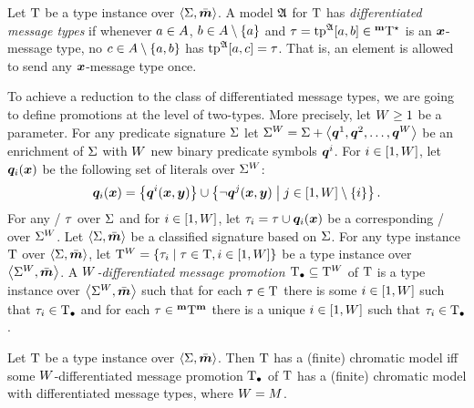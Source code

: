 \begin{definition}
Let $\mathrm{T}$ be a type instance over $\left\langle \mathrm{\Sigma},\bar{\bm{m}} \right\rangle$.
A model $\mathfrak{A}$ for $\mathrm{T}$ has \emph{differentiated message types}
if whenever $a\in A$, $b\in A\setminus\left\{a\right\}$
and $\tau = \operatorname{tp}^{\mathfrak{A}}[a,b]\in{{}^{\bm{\mathrm{m}}}{\mathrm{T}}^{\star}}$ is an $\bm{x}$-message type,
no $c\in A\setminus\left\{a,b\right\}$ has $\operatorname{tp}^{\mathfrak{A}}[a,c] = \tau$.
That is, an element is allowed to send any $\bm{x}$-message type once.
\end{definition}
To achieve a reduction to the class of differentiated message types, we are
going to define promotions at the level of two-types.
More precisely, let $W\geq1$ be a parameter.
For any predicate signature $\mathrm{\Sigma}$ let ${\mathrm{\Sigma}}^{W} = \mathrm{\Sigma} +
\left\langle \bm{q}^{1},\bm{q}^{2},\dots,\bm{q}^{W} \right\rangle$ be an enrichment of $\mathrm{\Sigma}$ with $W$ new binary
predicate symbols $\bm{q}^{i}$.
For $i\in[1,W]$, let $\bm{q}_{i}(\bm{x})$ be the following set of literals over
${\mathrm{\Sigma}}^{W}$:
\[
\bm{q}_{i}(\bm{x}) =
\left\{\bm{q}^{i}(\bm{x},\bm{y})\right\}\cup\left\{\lnot\bm{q}^{j}(\bm{x},\bm{y})\mathrel{}\middle|\mathrel{}j\in[1,W]\setminus\left\{i\right\}\right\}.
\]
For any \twotype/ $\tau$ over $\mathrm{\Sigma}$ and for $i\in[1,W]$, let ${\tau}_{i}
= \tau\cup\bm{q}_{i}(\bm{x})$ be a corresponding \twotype/ over ${\mathrm{\Sigma}}^{W}$.
Let $\left\langle \mathrm{\Sigma},\bar{\bm{m}} \right\rangle$ be a classified signature based on $\mathrm{\Sigma}$.
For any type instance $\mathrm{T}$ over $\left\langle \mathrm{\Sigma},\bar{\bm{m}} \right\rangle$, let
${\mathrm{T}}^{W} = \left\{{\tau}_{i}\mathrel{}\middle|\mathrel{}\tau\in\mathrm{T},i\in[1,W]\right\}$ be a type instance
over $\left\langle {\mathrm{\Sigma}}^{W},\bar{\bm{m}} \right\rangle$.
A \emph{$W$-differentiated message promotion $\mathrm{T}_{\bullet}\subseteq{\mathrm{T}}^{W}$} of
$\mathrm{T}$ is a type instance over $\left\langle {\mathrm{\Sigma}}^{W},\bar{\bm{m}} \right\rangle$ such that for each
$\tau\in\mathrm{T}$ there is some $i\in[1,W]$ such that ${\tau}_{i}\in\mathrm{T}_{\bullet}$ and for
each $\tau\in{{}^{\bm{\mathrm{m}}}{\mathrm{T}}^{\bm{\mathrm{m}}}}$ there is a unique $i\in[1,W]$ such that
${\tau}_{i}\in\mathrm{T}_{\bullet}$.
\begin{remark}
Let $\mathrm{T}$ be a type instance over $\left\langle \mathrm{\Sigma},\bar{\bm{m}} \right\rangle$.
Then $\mathrm{T}$ has a (finite) chromatic model iff some $W$-differentiated message
promotion $\mathrm{T}_{\bullet}$ of $\mathrm{T}$ has a (finite) chromatic model with differentiated
message types, where $W = M$.
\end{remark}
